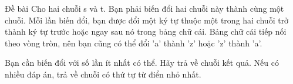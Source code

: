 Đề bài  
Cho hai chuỗi s và t. Bạn phải biến đổi hai chuỗi này thành cùng một chuỗi. Mỗi lần biến đổi, bạn được đổi một ký tự thuộc một trong hai chuỗi trở thành ký tự trước hoặc ngay sau nó trong bảng chữ cái. Bảng chữ cái tiếp nối theo vòng tròn, nên bạn cũng có thể đổi 'a' thành 'z' hoặc 'z' thành 'a'.  

   Bạn cần biến đổi với số lần ít nhất có thể. Hãy trả về chuỗi kết quả. Nếu có nhiều đáp án, trả về chuỗi có thứ tự từ điển nhỏ nhất.